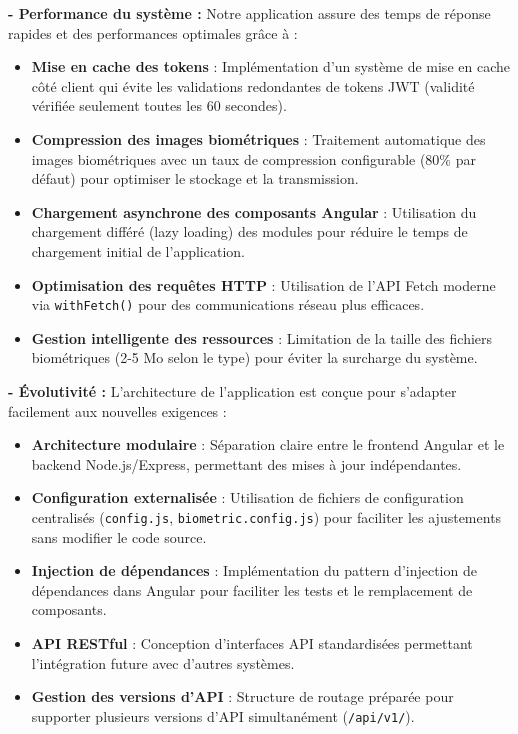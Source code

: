 \textbf{- Performance du système :} Notre application assure des temps de réponse rapides et des performances optimales grâce à :
\begin{itemize}[label=$\circ$]
  \item \textbf{Mise en cache des tokens} : Implémentation d'un système de mise en cache côté client qui évite les validations redondantes de tokens JWT (validité vérifiée seulement toutes les 60 secondes).
  \item \textbf{Compression des images biométriques} : Traitement automatique des images biométriques avec un taux de compression configurable (80\% par défaut) pour optimiser le stockage et la transmission.
  \item \textbf{Chargement asynchrone des composants Angular} : Utilisation du chargement différé (lazy loading) des modules pour réduire le temps de chargement initial de l'application.
  \item \textbf{Optimisation des requêtes HTTP} : Utilisation de l'API Fetch moderne via \texttt{withFetch()} pour des communications réseau plus efficaces.
  \item \textbf{Gestion intelligente des ressources} : Limitation de la taille des fichiers biométriques (2-5 Mo selon le type) pour éviter la surcharge du système.
\end{itemize}

\textbf{- Évolutivité :} L'architecture de l'application est conçue pour s'adapter facilement aux nouvelles exigences :
\begin{itemize}[label=$\circ$]
  \item \textbf{Architecture modulaire} : Séparation claire entre le frontend Angular et le backend Node.js/Express, permettant des mises à jour indépendantes.
  \item \textbf{Configuration externalisée} : Utilisation de fichiers de configuration centralisés (\texttt{config.js}, \texttt{biometric.config.js}) pour faciliter les ajustements sans modifier le code source.
  \item \textbf{Injection de dépendances} : Implémentation du pattern d'injection de dépendances dans Angular pour faciliter les tests et le remplacement de composants.
  \item \textbf{API RESTful} : Conception d'interfaces API standardisées permettant l'intégration future avec d'autres systèmes.
  \item \textbf{Gestion des versions d'API} : Structure de routage préparée pour supporter plusieurs versions d'API simultanément (\texttt{/api/v1/}).
\end{itemize}


